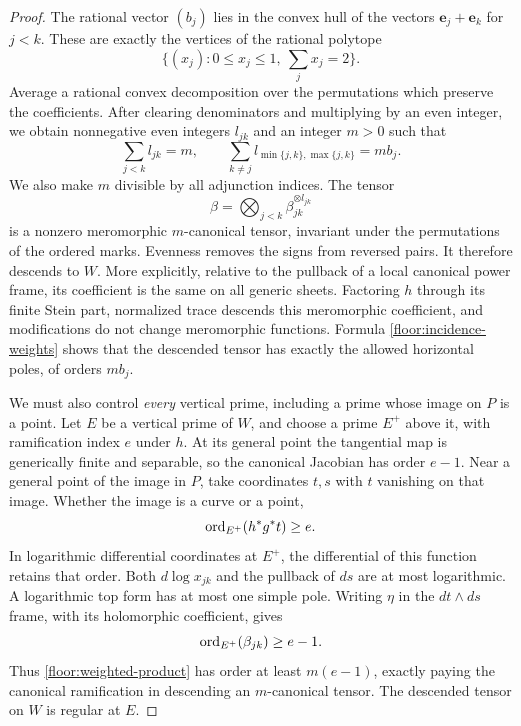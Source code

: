 \begin{proof}
The rational vector $(b_j)$ lies in the convex hull of the vectors
$\mathbf e_j+\mathbf e_k$ for $j<k$.  These are exactly the
vertices of the rational polytope
\[
 \bigl\{(x_j):0\le x_j\le1,\ \sum_jx_j=2\bigr\}.
\]
Average a rational convex decomposition over the permutations
which preserve the coefficients.  After clearing denominators
and multiplying by an even integer, we obtain nonnegative even
integers $l_{jk}$ and an integer $m>0$ such that
\begin{equation}
 \label{floor:incidence-weights}
 \sum_{j<k}l_{jk}=m,\qquad
 \sum_{k\ne j}l_{\min\{j,k\},\max\{j,k\}}=mb_j.
\end{equation}
We also make $m$ divisible by all adjunction indices.  The tensor
\begin{equation}
 \label{floor:weighted-product}
 \beta=\bigotimes_{j<k}\beta_{jk}^{\otimes l_{jk}}
\end{equation}
is a nonzero meromorphic $m$-canonical tensor, invariant under
the permutations of the ordered marks.  Evenness removes the
signs from reversed pairs.  It therefore descends to $W$.
More explicitly, relative to the pullback of a local canonical
power frame, its coefficient is the same on all generic sheets.
Factoring $h$ through its finite Stein part, normalized trace
descends this meromorphic coefficient, and modifications do not
change meromorphic functions.  Formula
\eqref{floor:incidence-weights} shows that the descended tensor
has exactly the allowed horizontal poles, of orders $mb_j$.

We must also control \emph{every} vertical prime, including a
prime whose image on $P$ is a point.  Let $E$ be a vertical prime
of $W$, and choose a prime $E^+$ above it, with ramification index
$e$ under $h$.  At its general point the tangential map is
generically finite and separable, so the canonical Jacobian has
order $e-1$.  Near a general point of the image in $P$, take
coordinates $t,s$ with $t$ vanishing on that image.  Whether the
image is a curve or a point,
\[
 \operatorname{ord}_{E^+}(h^*g^*t)\ge e.
\]
In logarithmic differential coordinates at $E^+$, the
differential of this function retains that order.  Both
$d\log x_{jk}$ and the pullback of $ds$ are at most logarithmic.
A logarithmic top form has at most one simple pole.  Writing
$\eta$ in the $dt\wedge ds$ frame, with its holomorphic
coefficient, gives
\begin{equation}
 \label{floor:vertical-order}
 \operatorname{ord}_{E^+}(\beta_{jk})\ge e-1.
\end{equation}
Thus \eqref{floor:weighted-product} has order at least $m(e-1)$,
exactly paying the canonical ramification in descending an
$m$-canonical tensor.  The descended tensor on $W$ is regular at
$E$.


\end{proof}
